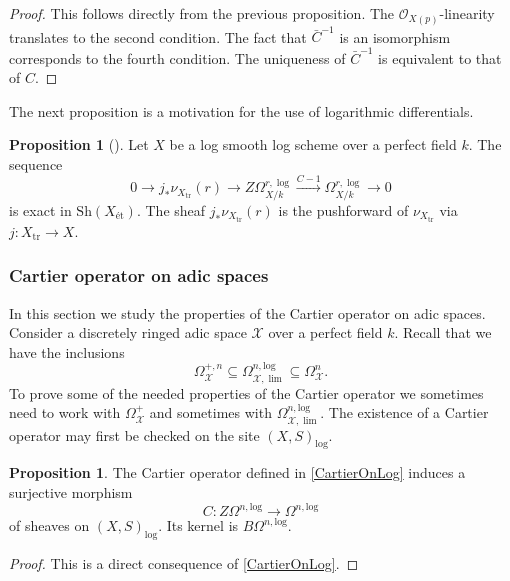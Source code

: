 \documentclass{amsart}
\def\Sh{\textrm{Sh}}
\def\et{\textrm{\'et}}
\theoremstyle{definition}
\newtheorem{proposition}[theorem]{Proposition}
\newcommand\llog{\mathrm{log}}
\numberwithin{equation}{section}
\begin{document}
\begin{proof}
	This follows directly from the previous proposition. The $\mathcal{O}_{X{(p)}}$-linearity translates to the second condition. The fact that $\bar{C}^{-1}$ is an isomorphism corresponds to the fourth condition. The uniqueness of $\bar{C}^{-1}$ is equivalent to that of $C$.
\end{proof}
The next proposition is a motivation for the use of logarithmic differentials.
\begin{proposition}[{\cite[Lemma 2.4.6]{sato2007logarithmic}}]\label{C-1ShortExactLog}
	Let $X$ be a log smooth log scheme over a perfect field $k$. The sequence 
	\[
	0\to j_*\nu_{X_{\textrm{tr}}}(r)\to Z\Omega^{r,\log}_{X/k}\xrightarrow{C-1}\Omega_{X/k}^{r,\log}\to 0
	\]
	is exact in  $\Sh(X_\et)$. The sheaf $j_*\nu_{X_{\textrm{tr}}}(r)$ is the pushforward of $\nu_{X_{\textrm{tr}}}$ via $j: X_\textrm{tr}\to X$. 	
\end{proposition}
\subsubsection*{Cartier operator on adic spaces}
In this section we study the properties of the Cartier operator on adic spaces. Consider a discretely ringed adic space $\mathcal{X}$ over a perfect field $k$.
Recall that we have the inclusions 
\[
\Omega_{\mathcal{X}}^{+,n}\subseteq \Omega_{\mathcal{X},\lim}^{n,\llog}\subseteq \Omega^n_{\mathcal{X}}.
\]
To prove some of the needed properties of the Cartier operator we sometimes need to work with $\Omega^{+}_{\mathcal{X}}$ and sometimes with $\Omega^{n,\llog}_{\mathcal{X},\lim}$. The existence of a Cartier operator may first be checked on the site $(X,S)_\llog$.

\begin{proposition}
	The Cartier operator defined in \cref{CartierOnLog} induces a surjective morphism 
	\[
	C: Z\Omega^{n,\llog}\to \Omega^{n,\llog}
	\]
	of sheaves on $(X,S)_\llog$. Its kernel is $B\Omega^{n,\llog}$.
\end{proposition}
\begin{proof}
	This is a direct consequence of \cref{CartierOnLog}. 
\end{proof}
\end{document}
